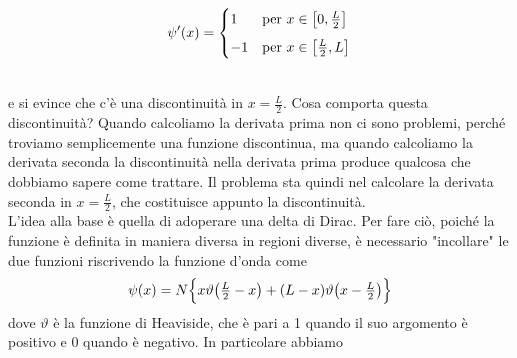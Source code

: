 \begin{soluzione}
\begin{minipage}{0.5\textwidth}
      \begin{equation*}
         \psi'(x)=
         \begin{cases}
            1 & \text{per } x \in \qty[ 0,\frac{L}{2} ]\\[0.2cm]
            -1 & \text{per } x \in \qty[ \frac{L}{2},L ]
         \end{cases}
      \end{equation*}
   \end{minipage}
   \begin{minipage}{0.5\textwidth}
      \begin{figure}[H]
         \centering
      \end{figure}
   \end{minipage}
   \\[0.4cm]e si evince che c'è una discontinuità in $x=\frac{L}{2}$. Cosa comporta questa discontinuità?
   Quando calcoliamo la derivata prima non ci sono problemi, perché troviamo semplicemente una funzione discontinua, ma quando calcoliamo la derivata seconda la discontinuità nella derivata prima produce qualcosa che dobbiamo sapere come trattare. Il problema sta quindi nel calcolare la derivata seconda in $x=\frac{L}{2}$, che costituisce appunto la discontinuità.\\
   L'idea alla base è quella di adoperare una delta di Dirac. Per fare ciò, poiché la funzione è definita in maniera diversa in regioni diverse, è necessario "incollare" le due funzioni riscrivendo la funzione d'onda come
   \begin{equation*}
      \psi(x)=N \Big\{ x \vartheta\qty( \textstyle \frac{L}{2} \displaystyle - x ) + (L - x) \vartheta\qty( x - \textstyle \frac{L}{2} \displaystyle) \Big\}
   \end{equation*}
   dove $\vartheta$ è la funzione di Heaviside, che è pari a 1 quando il suo argomento è positivo e 0 quando è negativo. In particolare abbiamo
   \begin{gather*}

\end{gather*}
\end{soluzione}
